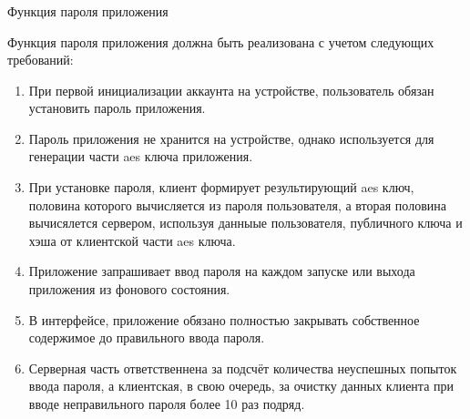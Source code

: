\subsubsection{} Функция пароля приложения
\label{sec:analysis:research:funcreq:pin}

Функция пароля приложения должна быть реализована с учетом следующих требований:
\begin{enumerate}
	\item При первой инициализации аккаунта на устройстве, пользователь обязан установить пароль приложения.
	\item Пароль приложения не хранится на устройстве, однако используется для генерации части \gls{aes} ключа приложения.
	\item При установке пароля, клиент формирует результирующий \gls{aes} ключ, половина которого вычисляется из пароля пользователя, а вторая половина вычисялется сервером, используя данныые пользователя, публичного ключа и хэша от клиентской части \gls{aes} ключа.
	\item Приложение запрашивает ввод пароля на каждом запуске или выхода приложения из фонового состояния.
	\item В интерфейсе, приложение обязано полностью закрывать собственное содержимое до правильного ввода пароля.
	\item Серверная часть ответственнена за подсчёт количества неуспешных попыток ввода пароля, а клиентская, в свою очередь, за очистку данных клиента при вводе неправильного пароля более 10 раз подряд.
\end{enumerate}